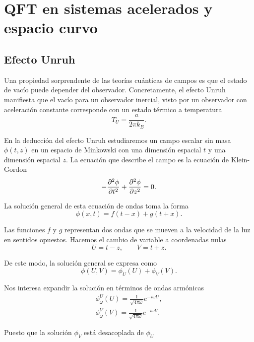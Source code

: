 \chapter{QFT en sistemas acelerados y espacio curvo}

\section{Efecto Unruh}

Una propiedad sorprendente de las teorías cuánticas de campos es que el estado de vacío
puede depender del observador.
Concretamente, el efecto Unruh manifiesta que el vacío para un observador inercial,
visto por un observador con aceleración constante corresponde con un estado térmico a temperatura
\begin{equation}
  T_U=\frac{a}{2\pi k_B}.
\end{equation}

En la deducción del efecto Unruh estudiaremos un campo escalar sin masa $\phi(t,z)$ en un espacio de Minkowski
con una dimensión espacial $t$ y una dimensión espacial $z$.
La ecuación que describe el campo es la ecuación de Klein-Gordon
\begin{equation}
  -\pdv[2]{\phi}{t}+\pdv[2]{\phi}{z}=0.
\end{equation}

La solución general de esta ecuación de ondas toma la forma
\begin{equation}
  \phi(x,t)=f(t-x)+g(t+x).
\end{equation}

Las funciones $f$ y $g$ representan dos ondas que se mueven a la velocidad de la luz en sentidos
opuestos. 
Hacemos el cambio de variable a coordenadas nulas
\begin{equation}
  U=t-z,   \qquad V=t+z.
\end{equation}

De este modo, la solución general se expresa como
\begin{equation}
  \phi(U,V)=\phi_U(U)+\phi_V(V).
\end{equation}

Nos interesa expandir la solución en términos de ondas armónicas
\begin{gather}
  \phi_\omega^U(U)=\frac{1}{\sqrt{4\pi\omega}} e^{-i\omega U},  \\
  \phi_\omega^V(V)=\frac{1}{\sqrt{4\pi\omega}} e^{-i\omega V}.
\end{gather}

Puesto que la solución $\phi_V$ está desacoplada de $\phi_U$

